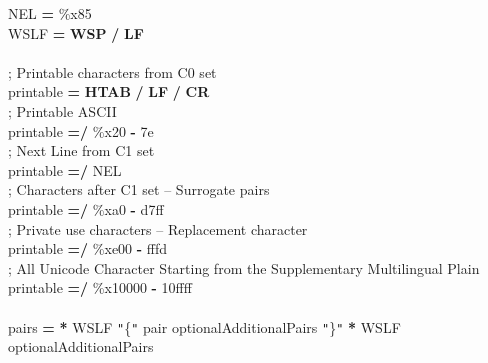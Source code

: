 {\small
{\color{color02} NEL} {\color{color03} \textbf{=}} {\color{color04} \%x85}{\color{color05} \\}{\color{color02} WSLF}
{\color{color03} \textbf{=}} {\color{color04} \textbf{WSP}} {\color{color03} \textbf{/}}
{\color{color04} \textbf{LF}}{\color{color05} \\\\}{\color{color06} ; Printable
characters from C0 set\\}{\color{color02} printable} {\color{color03} \textbf{=}}
{\color{color04} \textbf{HTAB}} {\color{color03} \textbf{/}} {\color{color04} \textbf{LF}}
{\color{color03} \textbf{/}} {\color{color04} \textbf{CR}}{\color{color05} \\}{\color{color06} ;
Printable ASCII\\}{\color{color02} printable} {\color{color03} \textbf{=/}} {\color{color04} \%x20}{\color{color03} \textbf{-}}{\color{color04} 7e}{\color{color05} \\}{\color{color06} ;
Next Line from C1 set\\}{\color{color02} printable} {\color{color03} \textbf{=/}}
{\color{color02} NEL}{\color{color05} \\}{\color{color06} ; Characters after C1
set -- Surrogate pairs\\}{\color{color02} printable} {\color{color03} \textbf{=/}}
{\color{color04} \%xa0}{\color{color03} \textbf{-}}{\color{color04} d7ff}{\color{color05} \\}{\color{color06} ;
Private use characters -- Replacement character\\}{\color{color02} printable}
{\color{color03} \textbf{=/}} {\color{color04} \%xe00}{\color{color03} \textbf{-}}{\color{color04} fffd}{\color{color05} \\}{\color{color06} ;
All Unicode Character Starting from the Supplementary Multilingual Plain\\}{\color{color02} printable}
{\color{color03} \textbf{=/}} {\color{color04} \%x10000}{\color{color03} \textbf{-}}{\color{color04} 10ffff}{\color{color05} \\\\}{\color{color02} pairs}
{\color{color03} \textbf{=}} {\color{color03} \textbf{*}}{\color{color02} WSLF}
{\color{color07} \texttt{"}\{\texttt{"}} {\color{color02} pair} {\color{color02} optionalAdditionalPairs}
{\color{color07} \texttt{"}\}\texttt{"}} {\color{color03} \textbf{*}}{\color{color02} WSLF}{\color{color05} \\}{\color{color02} optionalAdditionalPairs}
}

